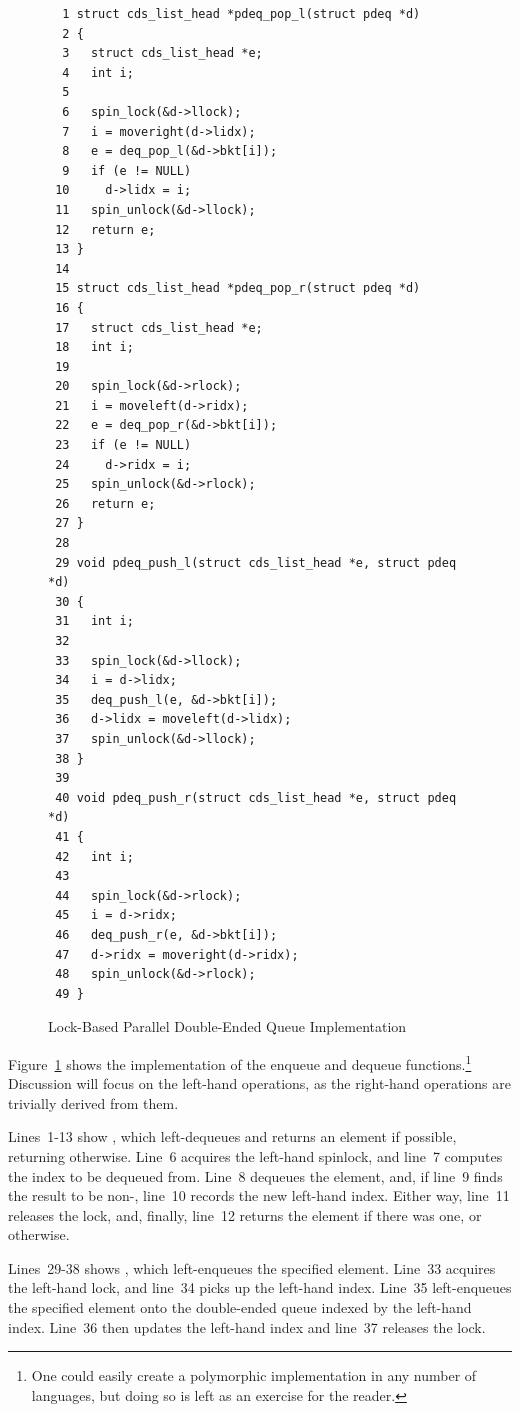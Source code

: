 \begin{figure}[bp]
{ \scriptsize
\begin{verbatim}
  1 struct cds_list_head *pdeq_pop_l(struct pdeq *d)
  2 {
  3   struct cds_list_head *e;
  4   int i;
  5 
  6   spin_lock(&d->llock);
  7   i = moveright(d->lidx);
  8   e = deq_pop_l(&d->bkt[i]);
  9   if (e != NULL)
 10     d->lidx = i;
 11   spin_unlock(&d->llock);
 12   return e;
 13 }
 14 
 15 struct cds_list_head *pdeq_pop_r(struct pdeq *d)
 16 {
 17   struct cds_list_head *e;
 18   int i;
 19 
 20   spin_lock(&d->rlock);
 21   i = moveleft(d->ridx);
 22   e = deq_pop_r(&d->bkt[i]);
 23   if (e != NULL)
 24     d->ridx = i;
 25   spin_unlock(&d->rlock);
 26   return e;
 27 }
 28 
 29 void pdeq_push_l(struct cds_list_head *e, struct pdeq *d)
 30 {
 31   int i;
 32 
 33   spin_lock(&d->llock);
 34   i = d->lidx;
 35   deq_push_l(e, &d->bkt[i]);
 36   d->lidx = moveleft(d->lidx);
 37   spin_unlock(&d->llock);
 38 }
 39 
 40 void pdeq_push_r(struct cds_list_head *e, struct pdeq *d)
 41 {
 42   int i;
 43 
 44   spin_lock(&d->rlock);
 45   i = d->ridx;
 46   deq_push_r(e, &d->bkt[i]);
 47   d->ridx = moveright(d->ridx);
 48   spin_unlock(&d->rlock);
 49 }
\end{verbatim}
}
\caption{Lock-Based Parallel Double-Ended Queue Implementation}
\label{fig:SMPdesign:Lock-Based Parallel Double-Ended Queue Implementation}
\end{figure}

Figure~\ref{fig:SMPdesign:Lock-Based Parallel Double-Ended Queue Implementation}
shows the implementation of the enqueue and dequeue functions.\footnote{
	One could easily create a polymorphic implementation in any
	number of languages, but doing so is left as an exercise for
	the reader.}
Discussion will focus on the left-hand operations, as the right-hand
operations are trivially derived from them.

Lines~1-13 show , which left-dequeues and returns
an element if possible, returning  otherwise.
Line~6 acquires the left-hand spinlock, and line~7 computes the
index to be dequeued from.
Line~8 dequeues the element, and, if line~9 finds the result to be
non-, line~10 records the new left-hand index.
Either way, line~11 releases the lock, and, finally, line~12 returns
the element if there was one, or  otherwise.

Lines~29-38 shows , which left-enqueues the specified
element.
Line~33 acquires the left-hand lock, and line~34 picks up the left-hand
index.
Line~35 left-enqueues the specified element onto the double-ended queue
indexed by the left-hand index.
Line~36 then updates the left-hand index and line~37 releases the lock.

